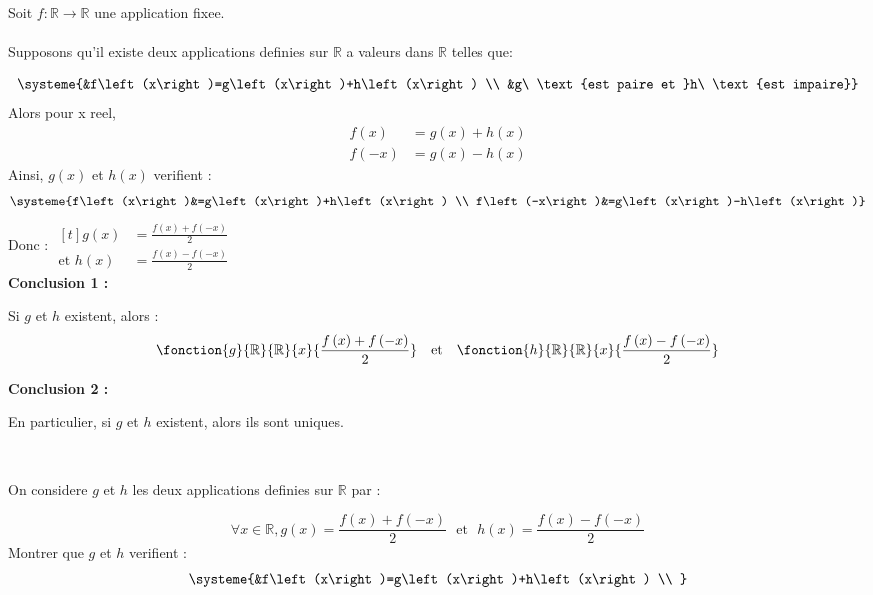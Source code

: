 \documentclass[12pt,twoside,a4paper]{article}
\begin{document}
			\begin{preuve}
				Soit $f\colon\mathbb{R}\longrightarrow\mathbb{R}$ une application fixee.\\ \ \\
				 Supposons qu'il existe deux applications definies sur $\mathbb{R}$ a valeurs dans $\mathbb{R}$ telles que:
				\begin{tab}
					$$\systeme{&f\left(x\right)=g\left(x\right)+h\left(x\right) \\
							   &g\ \text{est paire et }h\ \text{est impaire}}$$
					Alors pour x reel,
					$$\begin{aligned}
						f\left(x\right)&=g\left(x\right)+h\left(x\right) \\
						f\left(-x\right)&=g\left(x\right)-h\left(x\right)
					\end{aligned}$$
					Ainsi, $g\left(x\right)$ et $h\left(x\right)$ verifient :
					$$\systeme{f\left(x\right)&=g\left(x\right)+h\left(x\right) \\
							   f\left(-x\right)&=g\left(x\right)-h\left(x\right)}$$
					Donc : $\begin{aligned}[t]g\left(x\right)&=\frac{f\left(x\right)+f\left(-x\right)}{2} \\
								 \text{et }h\left(x\right)&=\frac{f\left(x\right)-f\left(-x\right)}{2}\end{aligned}$\newpage \ \\
					\textbf{Conclusion 1 :} 
					\begin{tab}
						Si $g$ et $h$ existent, alors :
						$$\fonction{g}{\mathbb{R}}{\mathbb{R}}{x}{\frac{f\left(x\right)+f\left(-x\right)}{2}} \ \ \ \text{et} \ \ \ \fonction{h}{\mathbb{R}}{\mathbb{R}}{x}{\frac{f\left(x\right)-f\left(-x\right)}{2}}$$
					\end{tab}
					\textbf{Conclusion 2 :} 
					\begin{tab}
						En particulier, si $g$ et $h$ existent, alors ils sont uniques.
					\end{tab}\ \\
				\end{tab}
				 On considere $g$ et $h$ les deux applications definies sur $\mathbb{R}$ par :
				\begin{tab}
					$$\forall x\in\mathbb{R},g\left(x\right)=\frac{f\left(x\right)+f\left(-x\right)}{2} \ \ \ \text{et} \ \ \ h\left(x\right)=\frac{f\left(x\right)-f\left(-x\right)}{2}$$
					Montrer que $g$ et $h$ verifient :
					$$\systeme{&f\left(x\right)=g\left(x\right)+h\left(x\right) \\
}$$
\end{tab}
\end{preuve}
\end{document}
